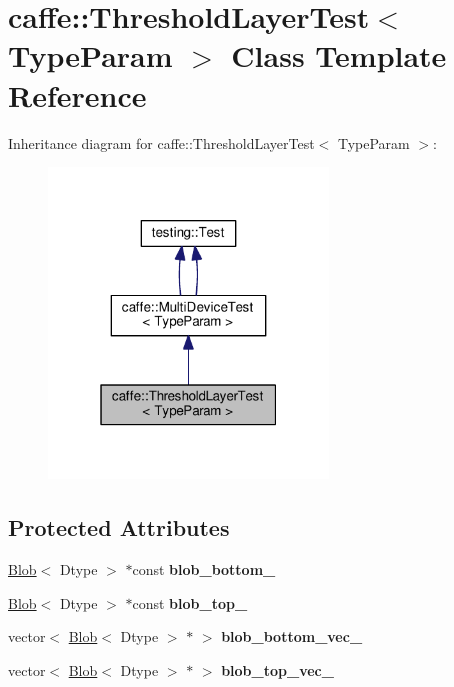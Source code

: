 \hypertarget{classcaffe_1_1_threshold_layer_test}{}\section{caffe\+:\+:Threshold\+Layer\+Test$<$ Type\+Param $>$ Class Template Reference}
\label{classcaffe_1_1_threshold_layer_test}


Inheritance diagram for caffe\+:\+:Threshold\+Layer\+Test$<$ Type\+Param $>$\+:
\nopagebreak
\begin{figure}[H]
\begin{center}
\leavevmode
\includegraphics[width=211pt]{classcaffe_1_1_threshold_layer_test__inherit__graph}
\end{center}
\end{figure}
\subsection*{Protected Attributes}
\begin{DoxyCompactItemize}
\item 
\mbox{\label{classcaffe_1_1_threshold_layer_test_affc47bfd9769fe38a86224e421dfdade}} 
\mbox{\hyperlink{classcaffe_1_1_blob}{Blob}}$<$ Dtype $>$ $\ast$const {\bfseries blob\+\_\+bottom\+\_\+}
\item 
\mbox{\label{classcaffe_1_1_threshold_layer_test_a121b0b378e11a5eee0e09e62104eb8d8}} 
\mbox{\hyperlink{classcaffe_1_1_blob}{Blob}}$<$ Dtype $>$ $\ast$const {\bfseries blob\+\_\+top\+\_\+}
\item 
\mbox{\label{classcaffe_1_1_threshold_layer_test_a707f7bd9404b664c30bf504d2349aacd}} 
vector$<$ \mbox{\hyperlink{classcaffe_1_1_blob}{Blob}}$<$ Dtype $>$ $\ast$ $>$ {\bfseries blob\+\_\+bottom\+\_\+vec\+\_\+}
\item 
\mbox{\label{classcaffe_1_1_threshold_layer_test_a7cb6fc3598d235548632972392147ff2}} 
vector$<$ \mbox{\hyperlink{classcaffe_1_1_blob}{Blob}}$<$ Dtype $>$ $\ast$ $>$ {\bfseries blob\+\_\+top\+\_\+vec\+\_\+}
\end{DoxyCompactItemize}
